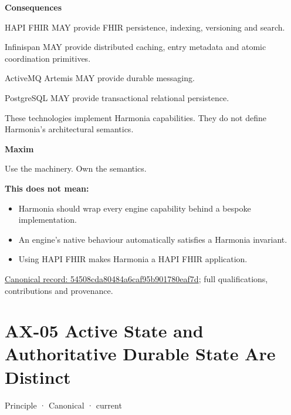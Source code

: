 \par\medskip\textbf{Consequences}\par


HAPI FHIR MAY provide FHIR persistence, indexing, versioning and search.



Infinispan MAY provide distributed caching, entry metadata and atomic
coordination primitives.



ActiveMQ Artemis MAY provide durable messaging.



PostgreSQL MAY provide transactional relational persistence.



These technologies implement Harmonia capabilities. They do not define
Harmonia's architectural semantics.



\par\medskip\textbf{Maxim}\par


Use the machinery. Own the semantics.



\textbf{This does not mean:}



\begin{itemize}


\item Harmonia should wrap every engine capability behind a bespoke implementation.

\item An engine's native behaviour automatically satisfies a Harmonia invariant.

\item Using HAPI FHIR makes Harmonia a HAPI FHIR application.

\end{itemize}

{\footnotesize \href{../../../../continuum/motivation/principle/54508cda80484a6caf95b901780eaf7d.md}{Canonical record: 54508cda80484a6caf95b901780eaf7d}; full qualifications, contributions and provenance.}\par
\section{AX-05 Active State and Authoritative Durable State Are Distinct}

\label{element:0412a2084f0145babc4f022c71fea65f}
{\small Principle · Canonical · current}\par

